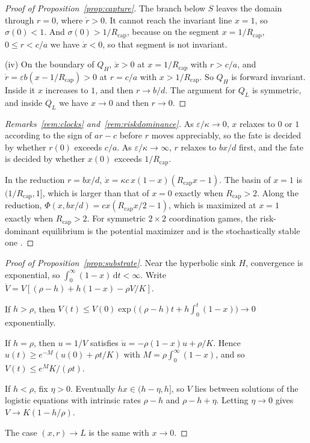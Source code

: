 \documentclass[11pt]{article}
\theoremstyle{plain}
\theoremstyle{definition}
\newcommand{\Rcap}{R_{\mathrm{cap}}}
\newcommand{\dd}{\mathrm{d}}
\begin{document}
\begin{proof}[Proof of Proposition~\ref{prop:capture}]
The branch below $S$ leaves the domain through $r=0$, where $\dot r>0$. It cannot reach the invariant line $x=1$, so $\sigma(0)<1$. And $\sigma(0)>1/\Rcap$, because on the segment $x=1/\Rcap$, $0\le r<c/a$ we have $\dot x<0$, so that segment is not invariant.

(iv) On the boundary of $Q_H$, $\dot x>0$ at $x=1/\Rcap$ with $r>c/a$, and $\dot r=\varepsilon b(x-1/\Rcap)>0$ at $r=c/a$ with $x>1/\Rcap$. So $Q_H$ is forward invariant. Inside it $x$ increases to $1$, and then $r\to b/d$. The argument for $Q_L$ is symmetric, and inside $Q_L$ we have $x\to0$ and then $r\to0$.
\end{proof}

\begin{proof}[Remarks~\ref{rem:clocks} and~\ref{rem:riskdominance}]
As $\varepsilon/\kappa\to0$, $x$ relaxes to $0$ or $1$ according to the sign of $ar-c$ before $r$ moves appreciably, so the fate is decided by whether $r(0)$ exceeds $c/a$. As $\varepsilon/\kappa\to\infty$, $r$ relaxes to $bx/d$ first, and the fate is decided by whether $x(0)$ exceeds $1/\Rcap$.

In the reduction $r=bx/d$, $\dot x=\kappa c\,x(1-x)(\Rcap x-1)$. The basin of $x=1$ is $(1/\Rcap,1]$, which is larger than that of $x=0$ exactly when $\Rcap>2$. Along the reduction, $\Phi(x,bx/d)=cx(\Rcap x/2-1)$, which is maximized at $x=1$ exactly when $\Rcap>2$. For symmetric $2\times2$ coordination games, the risk-dominant equilibrium is the potential maximizer and is the stochastically stable one \citep{kandori1993,young1993}.
\end{proof}

\begin{proof}[Proof of Proposition~\ref{prop:substrate}]
Near the hyperbolic sink $H$, convergence is exponential, so $\int_0^\infty(1-x)\,\dd t<\infty$. Write $\dot V=V[(\rho-h)+h(1-x)-\rho V/K]$.

If $h>\rho$, then $V(t)\le V(0)\exp\big((\rho-h)t+h\int_0^t(1-x)\big)\to0$ exponentially.

If $h=\rho$, then $u=1/V$ satisfies $\dot u=-\rho(1-x)u+\rho/K$. Hence $u(t)\ge e^{-M}(u(0)+\rho t/K)$ with $M=\rho\int_0^\infty(1-x)$, and so $V(t)\le e^{M}K/(\rho t)$.

If $h<\rho$, fix $\eta>0$. Eventually $hx\in(h-\eta,h]$, so $V$ lies between solutions of the logistic equations with intrinsic rates $\rho-h$ and $\rho-h+\eta$. Letting $\eta\to0$ gives $V\to K(1-h/\rho)$.

The case $(x,r)\to L$ is the same with $x\to0$.
\end{proof}
\end{document}
